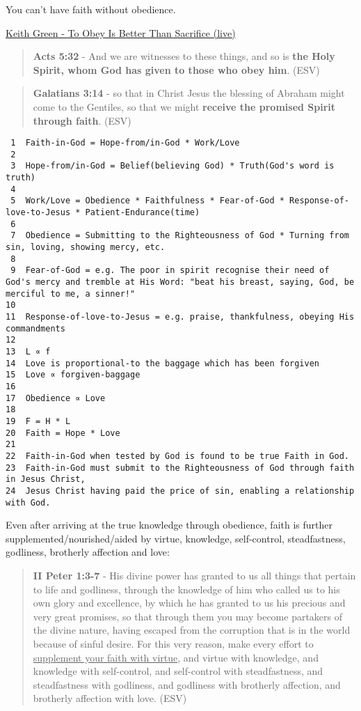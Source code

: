 \documentclass[11pt]{article}
\begin{document}
You can't have faith without obedience.

\href{https://youtu.be/TzWyZxlwGKI?list=RDz7oCa9BvO9g\&t=98}{Keith Green - To Obey Is Better Than Sacrifice (live)}

\begin{quote}
\textbf{Acts 5:32} - And we are witnesses to these things, and so is \textbf{the Holy Spirit, whom God has given to those who obey him}. (ESV)
\end{quote}

\begin{quote}
\textbf{Galatians 3:14} - so that in Christ Jesus the blessing of Abraham might come to the Gentiles, so that we might \textbf{receive the promised Spirit through faith}. (ESV)
\end{quote}

\begin{verbatim}
 1  Faith-in-God = Hope-from/in-God * Work/Love
 2  
 3  Hope-from/in-God = Belief(believing God) * Truth(God's word is truth)
 4  
 5  Work/Love = Obedience * Faithfulness * Fear-of-God * Response-of-love-to-Jesus * Patient-Endurance(time)
 6  
 7  Obedience = Submitting to the Righteousness of God * Turning from sin, loving, showing mercy, etc.
 8  
 9  Fear-of-God = e.g. The poor in spirit recognise their need of God's mercy and tremble at His Word: "beat his breast, saying, God, be merciful to me, a sinner!"
10  
11  Response-of-love-to-Jesus = e.g. praise, thankfulness, obeying His commandments
12  
13  L ∝ f
14  Love is proportional-to the baggage which has been forgiven
15  Love ∝ forgiven-baggage
16  
17  Obedience ∝ Love
18  
19  F = H * L
20  Faith = Hope * Love
21  
22  Faith-in-God when tested by God is found to be true Faith in God.
23  Faith-in-God must submit to the Righteousness of God through faith in Jesus Christ,
24  Jesus Christ having paid the price of sin, enabling a relationship with God.
\end{verbatim}

Even after arriving at the true knowledge through obedience, faith is further supplemented/nourished/aided by virtue, knowledge, self-control, steadfastness, godliness, brotherly affection and love:

\begin{quote}
\textbf{II Peter 1:3-7} - His divine power has granted to us all things that pertain to life and godliness, through the knowledge of him who called us to his own glory and excellence, by which he has granted to us his precious and very great promises, so that through them you may become partakers of the divine nature, having escaped from the corruption that is in the world because of sinful desire. For this very reason, make every effort to \uline{supplement your faith with virtue}, and virtue with knowledge, and knowledge with self-control, and self-control with steadfastness, and steadfastness with godliness, and godliness with brotherly affection, and brotherly affection with love. (ESV)
\end{quote}
\end{document}
